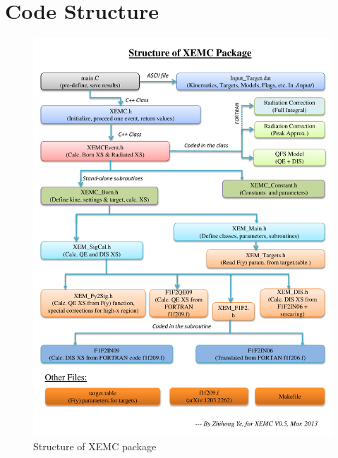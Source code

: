 \section{Code Structure}
\begin{figure}[!ht]
 \begin{center}
  \includegraphics[angle=0,width=1.0\textwidth]{./figures/xemc/XEMC_Structure}
  \caption[Structure of XEMC package]{Structure of XEMC package}
  \label{xemc_struct}
 \end{center}
\end{figure}
